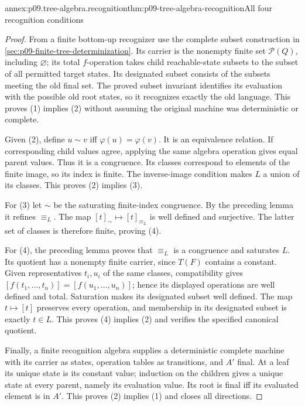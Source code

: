 \begin{annexitem}{annex:p09.tree-algebra.recognition}{thm:p09-tree-algebra-recognition}{All four recognition conditions}
\begin{proof}
From a finite bottom-up recognizer use the complete subset construction
in \cref{sec:p09-finite-tree-determinization}. Its carrier is the
nonempty finite set \(\mathcal P(Q)\), including \(\varnothing\);
its total \(f\)-operation takes child reachable-state subsets to
the subset of all permitted target states. Its designated subset
consists of the subsets meeting the old final set. The proved subset
invariant identifies its evaluation with the possible old root states,
so it recognizes exactly the old language. This proves (1) implies (2)
without assuming the original machine was deterministic or complete.

Given (2), define \(u\sim v\) iff \(\varphi(u)=\varphi(v)\).
It is an equivalence relation. If corresponding child values agree,
applying the same algebra operation gives equal parent values.
Thus it is a congruence. Its classes correspond to elements of the
finite image, so its index is finite. The inverse-image condition
makes \(L\) a union of its classes. This proves (2) implies (3).

For (3) let \(\sim\) be the saturating finite-index congruence.
By the preceding lemma it refines \(\equiv_L\). The map
\([t]_\sim\mapsto[t]_{\equiv_L}\) is well defined and surjective.
The latter set of classes is therefore finite, proving (4).

For (4), the preceding lemma proves that \(\equiv_L\) is a
congruence and saturates \(L\). Its quotient has a nonempty finite
carrier, since \(T(F)\) contains a constant. Given representatives
\(t_i,u_i\) of the same classes, compatibility gives
\([f(t_1,\ldots,t_n)]=[f(u_1,\ldots,u_n)]\); hence its displayed
operations are well defined and total. Saturation makes its
designated subset well defined. The map \(t\mapsto[t]\) preserves
every operation, and membership in its designated subset is exactly
\(t\in L\). This proves (4) implies (2) and verifies the specified
canonical quotient.

Finally, a finite recognition algebra supplies a deterministic complete
machine with its carrier as states, operation tables as transitions,
and \(A'\) final. At a leaf its unique state is its constant value;
induction on the children gives a unique state at every parent,
namely its evaluation value. Its root is final iff its evaluated
element is in \(A'\). This proves (2) implies (1) and closes all
directions.
\end{proof}
\end{annexitem}

